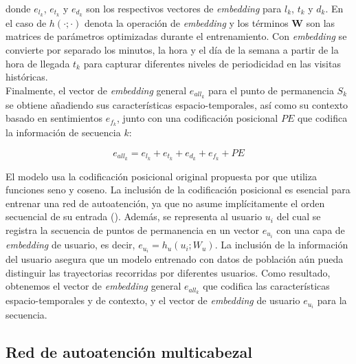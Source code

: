 donde \(e_{l_k}\), \(e_{t_k}\) y \(e_{d_k}\) son los respectivos 
vectores de \textit{embedding} para \(l_k\), \(t_k\) y \(d_k\). 
En el caso de \(h(\cdot; \cdot)\) 
denota la operación de \textit{embedding} y los términos 
\(\mathbf{W}\) son las matrices de parámetros optimizadas 
durante el entrenamiento. Con \textit{embedding} se convierte por separado los minutos, 
la hora y el día de la semana a partir de la hora de llegada 
\(t_k\) para capturar diferentes niveles de periodicidad en 
las visitas históricas.\\

Finalmente, el vector de \textit{embedding} general 
$e_{all_k}$ para el punto de permanencia $S_k$ se obtiene 
añadiendo sus características espacio-temporales, as\'i como su contexto
basado en sentimientos $e_{f_k}$, junto con una codificación posicional 
$PE$ que codifica la información de secuencia $k$:

\begin{equation}
    e_{all_k}  = e_{l_k} + e_{t_k} + e_{d_k} + e_{f_k} + PE \tag{2}
\end{equation}

El modelo usa la codificación posicional original propuesta por 
\cite{vaswani2017attention} que utiliza funciones seno y coseno. 
La inclusión de la codificación posicional es esencial para 
entrenar una red de autoatención, ya que no asume implícitamente 
el orden secuencial de su entrada (\cite{vaswani2017attention}). Además, 
se representa al usuario $u_i$ del cual se registra la secuencia 
de puntos de permanencia en un vector $e_{u_i}$ con una 
capa de \textit{embedding} de usuario, es decir, 
$e_{u_i} = h_u(u_i; W_u)$. La inclusión de la información 
del usuario asegura que un modelo entrenado con datos de 
población aún pueda distinguir las trayectorias recorridas por 
diferentes usuarios. Como resultado, obtenemos el vector de \textit{embedding} 
general ${e}_{all_k}$ que codifica las características 
espacio-temporales y de contexto, y el vector de 
\textit{embedding} de usuario ${e}_{u_i}$ para la secuencia.


\subsection{Red de autoatención multicabezal}

